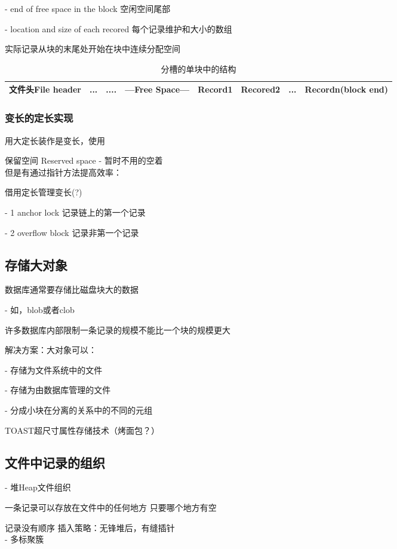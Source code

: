 \documentclass{article}        %
\begin{document}
- end of free space in the block 空闲空间尾部 

- location and size of each recored 每个记录维护和大小的数组

实际记录从块的末尾处开始在块中连续分配空间

\begin{table}[htbp]
  \centering
  \caption{分槽的单块中的结构}
  \begin{tabular}{|c|c|c|c|c|c|c|c|}
    \hline 
    文件头File header&...&....&---Free Space---&Record1&Recored2&...&Recordn(block end) \\
    \hline
  \end{tabular}
\end{table}

\subsubsection{变长的定长实现}

用大定长装作是变长，使用 

保留空间 Reserved space - 暂时不用的空着\\ 

但是有通过指针方法提高效率：

借用定长管理变长(?)

- 1 anchor lock 记录链上的第一个记录

- 2 overflow block 记录非第一个记录

\subsection{存储大对象}

数据库通常要存储比磁盘块大的数据 

- 如，blob或者clob

许多数据库内部限制一条记录的规模不能比一个块的规模更大

解决方案：大对象可以：

- 存储为文件系统中的文件 

- 存储为由数据库管理的文件 

- 分成小块在分离的关系中的不同的元组

TOAST超尺寸属性存储技术（烤面包？） 

\subsection{文件中记录的组织}

- 堆Heap文件组织  

一条记录可以存放在文件中的任何地方 只要哪个地方有空

记录没有顺序 插入策略：无锋堆后，有缝插针 \\ 

- 多标聚簇
\end{document}
